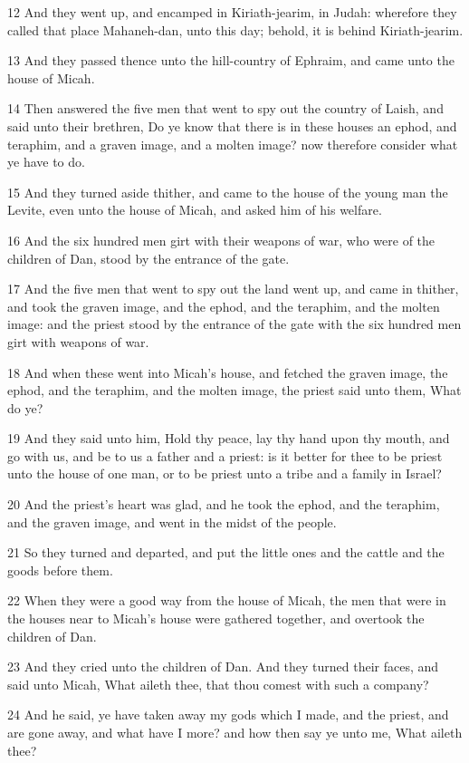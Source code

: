 \par 12 And they went up, and encamped in Kiriath-jearim, in Judah: wherefore they called that place Mahaneh-dan, unto this day; behold, it is behind Kiriath-jearim.
\par 13 And they passed thence unto the hill-country of Ephraim, and came unto the house of Micah.
\par 14 Then answered the five men that went to spy out the country of Laish, and said unto their brethren, Do ye know that there is in these houses an ephod, and teraphim, and a graven image, and a molten image? now therefore consider what ye have to do.
\par 15 And they turned aside thither, and came to the house of the young man the Levite, even unto the house of Micah, and asked him of his welfare.
\par 16 And the six hundred men girt with their weapons of war, who were of the children of Dan, stood by the entrance of the gate.
\par 17 And the five men that went to spy out the land went up, and came in thither, and took the graven image, and the ephod, and the teraphim, and the molten image: and the priest stood by the entrance of the gate with the six hundred men girt with weapons of war.
\par 18 And when these went into Micah's house, and fetched the graven image, the ephod, and the teraphim, and the molten image, the priest said unto them, What do ye?
\par 19 And they said unto him, Hold thy peace, lay thy hand upon thy mouth, and go with us, and be to us a father and a priest: is it better for thee to be priest unto the house of one man, or to be priest unto a tribe and a family in Israel?
\par 20 And the priest's heart was glad, and he took the ephod, and the teraphim, and the graven image, and went in the midst of the people.
\par 21 So they turned and departed, and put the little ones and the cattle and the goods before them.
\par 22 When they were a good way from the house of Micah, the men that were in the houses near to Micah's house were gathered together, and overtook the children of Dan.
\par 23 And they cried unto the children of Dan. And they turned their faces, and said unto Micah, What aileth thee, that thou comest with such a company?
\par 24 And he said, ye have taken away my gods which I made, and the priest, and are gone away, and what have I more? and how then say ye unto me, What aileth thee?
